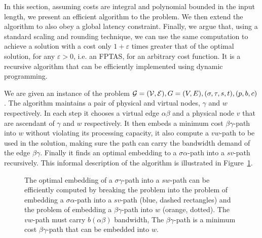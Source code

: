 In this section, 
assuming costs are integral and polynomial bounded in the input length,
we present an efficient algorithm to the \VPN{} problem.
We then extend the algorithm to also obey a global latency constraint.
Finally, we argue that, using a standard scaling and rounding technique, we can use
the same computation to achieve a solution with a cost only
$1 + \varepsilon$ times greater that of the optimal solution, for any
$\varepsilon > 0$, i.e. an FPTAS, for an arbitrary cost function.
It is a recursive algorithm that can be efficiently implemented using dynamic
programming.

We are given an instance of the \VPN{} problem 
$
\mathcal{G} = (\mathcal{V}, \mathcal{E}),
G = (V, E),
(\sigma , \tau , s, t),
(p, b, c)
$.
The algorithm maintains a pair of physical and virtual nodes,
$\gamma$ and $w$ respectively.
In each step it chooses a virtual edge $\alpha\beta$ and a physical node $v$
that are ascendant of $\gamma$ and $w$ respectively.
It then embeds a minimum cost $\beta\gamma$-path into $w$ 
without violating its processing capacity,
it also compute a $vw$-path to be used in the solution, 
making sure the path can carry the bandwidth demand of the edge $\beta\gamma$.
Finally it finds an optimal embedding to a $\sigma\alpha$-path into a $sv$-path 
recursively.
This informal description of the algorithm is illustrated in Figure~\ref{fig:dp1}.

\begin{figure}[ht]
\centering

\caption[]{
\label{fig:dp1}
The optimal embedding of a $\sigma \gamma $-path into a $sw$-path can be
efficiently computed by breaking the problem into the problem of embedding 
a $\sigma\alpha$-path into a $sv$-path (blue, dashed rectangles) 
and the problem of embedding a $\beta\gamma$-path into $w$ (orange, dotted).
The $vw$-path must carry $b(\alpha\beta)$ bandwidth, 
The $\beta\gamma$-path is a minimum cost $\beta\gamma$-path 
that can be embedded into $w$.
}
\end{figure}

